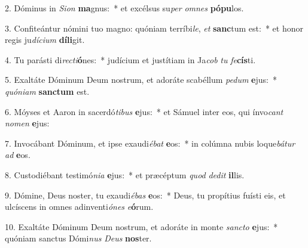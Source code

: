 2. Dóminus in \textit{Si}\textit{on} \textbf{ma}gnus:~*  et excélsus su\textit{per} \textit{om}\textit{nes} \textbf{pó}\textbf{pu}los.\

3. Confiteántur nómini tuo magno: quóniam terríbi\textit{le}, \textit{et} \textbf{sanc}tum est:~*  et honor regis ju\textit{dí}\textit{ci}\textit{um} \textbf{dí}\textbf{li}git.\

4. Tu parásti di\textit{rec}\textit{ti}\textbf{ó}nes:~*  judícium et justítiam in Ja\textit{cob} \textit{tu} \textit{fe}\textbf{cís}ti.\

5. Exaltáte Dóminum Deum nostrum, et adoráte scabéllum \textit{pe}\textit{dum} \textbf{e}jus:~*  \textit{quón}\textit{i}\textit{am} \textbf{sanc}\textbf{tum} est.\

6. Móyses et Aaron in sacerdó\textit{ti}\textit{bus} \textbf{e}jus:~*  et Sámuel inter eos, qui ínvo\textit{cant} \textit{no}\textit{men} \textbf{e}jus:\

7. Invocábant Dóminum, et ipse exaudi\textit{é}\textit{bat} \textbf{e}os:~*  in colúmna nubis loque\textit{bá}\textit{tur} \textit{ad} \textbf{e}os.\

8. Custodiébant testimó\textit{ni}\textit{a} \textbf{e}jus:~*  et præcéptum \textit{quod} \textit{de}\textit{dit} \textbf{il}lis.\

9. Dómine, Deus noster, tu exaudi\textit{é}\textit{bas} \textbf{e}os:~*  Deus, tu propítius fuísti eis, et ulcíscens in omnes adinventi\textit{ó}\textit{nes} \textit{e}\textbf{ó}rum.\

10. Exaltáte Dóminum Deum nostrum, et adoráte in monte \textit{sanc}\textit{to} \textbf{e}jus:~*  quóniam sanctus Dómi\textit{nus} \textit{De}\textit{us} \textbf{nos}ter.\

